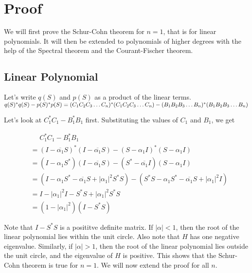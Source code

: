 \documentclass[twofold]{article}
\newcommand*\conj[1]{\overline{#1}}
\newcommand*\adj[1]{#1^*}
\newcommand*\abs[1]{\left \vert #1 \right\vert}
\theoremstyle{plain}
\theoremstyle{definition}
\begin{document}
\section{Proof}

We will first prove the Schur-Cohn theorem for \(n =1\), that is for linear polynomials. It will then be extended to polynomials of higher degrees with the help of the Spectral theorem and the Courant-Fischer theorem. 


\subsection{Linear Polynomial}


Let's write \(q(S)\) and \(p(S)\) as a product of the linear terms. \(\adj{q(S)} q(S) - \adj{p(S)} p(S) \\= \adj{(C_1C_2C_3 \ldots C_n)}(C_1C_2C_3\ldots C_n) - \adj{(B_1B_2B_3\ldots B_n)} (B_1B_2B_3\ldots B_n)\)

Let's look at \(\adj{C_1} C_1 - \adj{B_1} B_1\) first. Substituting the values of \(C_1\) and \(B_1\), we get 

\begin{equation*}
\begin{split}
& \phantom{=}    \adj{C_1}C_1 - \adj{B_1} B_1 \\
 & = \adj{(I - \conj{\alpha_1}S)} (I - \conj{\alpha_1}S) - \adj{(S - \alpha_1 I)} (S - \alpha_1 I) \\
& = (I - \alpha_1\adj{S}) (I - \conj{\alpha_1}S) - (\adj{S} - \conj{\alpha_1} I) (S - \alpha_1 I) \\
 & = (I - \alpha_1\adj{S} - \conj{\alpha_1}S + \abs{\alpha_1}^2 \adj{S} S) - (\adj{S} S - \alpha_1 \adj{S} - \conj{\alpha_1} S + \abs{\alpha_1}^2I)\\
& = I - \abs{\alpha_1}^2 I - \adj{S} S + \abs{\alpha_1}^2 \adj{S} S \\
& = (1 - \abs{\alpha_1}^2) (I - \adj{S} S)
\end{split}
\end{equation*}

Note that \(I - \adj{S} S\) is a posititve definite matrix. If \(\abs{\alpha} < 1\), then the root of the linear polynomial lies within the unit circle. Also note that \(H\) has one negative eigenvalue. Similarly, if \(\abs{\alpha} > 1\), then the root of the linear polynomial lies outside the unit circle, and the eigenvalue of \(H\) is positive. This shows that the Schur-Cohn theorem is true for \(n = 1\). We will now extend the proof for all \(n\). 
\end{document}
